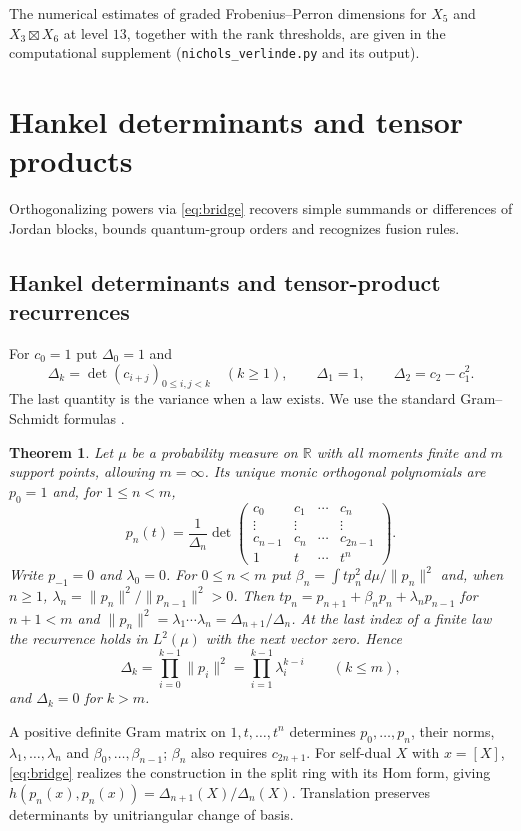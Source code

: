 \documentclass[11pt,reqno]{amsart}
\newtheorem{theorem}{Theorem}[section]
\theoremstyle{definition}
\newcommand{\RR}{\mathbb R}
\begin{document}
The numerical estimates of graded Frobenius--Perron dimensions for $X_5$ and $X_3\boxtimes X_6$ at level $13$, together with the rank thresholds, are given in the computational supplement (\texttt{nichols\_verlinde.py} and its output).

\section{Hankel determinants and tensor products}\label{sec:hankel}

Orthogonalizing powers via \eqref{eq:bridge} recovers simple summands or differences of Jordan blocks, bounds quantum-group orders and recognizes fusion rules.

\subsection{Hankel determinants and tensor-product recurrences}

For $c_0=1$ put $\Delta_0=1$ and
\[
 \Delta_k=\det(c_{i+j})_{0\leq i,j<k}\quad(k\geq1),\qquad
 \Delta_1=1,\qquad\Delta_2=c_2-c_1^2.
\]
The last quantity is the variance when a law exists. We use the standard Gram--Schmidt formulas \cite[Chapter~I]{Chi}.

\begin{theorem}\label{thm:jacobi}
Let $\mu$ be a probability measure on $\RR$ with all moments finite and $m$ support points, allowing $m=\infty$. Its unique monic orthogonal polynomials are $p_0=1$ and, for $1\le n<m$,
\[
 p_n(t)=\frac{1}{\Delta_n}\det\begin{pmatrix}c_0&c_1&\cdots&c_n\\ \vdots&\vdots&&\vdots\\ c_{n-1}&c_n&\cdots&c_{2n-1}\\ 1&t&\cdots&t^n\end{pmatrix}.
\]
Write $p_{-1}=0$ and $\lambda_0=0$. For $0\le n<m$ put $\beta_n=\int t p_n^2\,d\mu/\|p_n\|^2$ and, when $n\ge1$, $\lambda_n=\|p_n\|^2/\|p_{n-1}\|^2>0$. Then $tp_n=p_{n+1}+\beta_np_n+\lambda_np_{n-1}$ for $n+1<m$ and $\|p_n\|^2=\lambda_1\cdots\lambda_n=\Delta_{n+1}/\Delta_n$. At the last index of a finite law the recurrence holds in $L^2(\mu)$ with the next vector zero. Hence
\[
 \Delta_k=\prod_{i=0}^{k-1}\|p_i\|^2=\prod_{i=1}^{k-1}\lambda_i^{k-i}\qquad(k\leq m),
\]
and $\Delta_k=0$ for $k>m$.
\end{theorem}

A positive definite Gram matrix on $1,t,\ldots,t^n$ determines $p_0,\ldots,p_n$, their norms, $\lambda_1,\ldots,\lambda_n$ and $\beta_0,\ldots,\beta_{n-1}$; $\beta_n$ also requires $c_{2n+1}$. For self-dual $X$ with $x=[X]$, \eqref{eq:bridge} realizes the construction in the split ring with its Hom form, giving $h(p_n(x),p_n(x))=\Delta_{n+1}(X)/\Delta_n(X)$. Translation preserves determinants by unitriangular change of basis.
\end{document}
